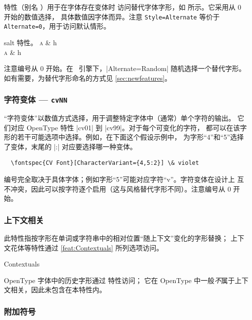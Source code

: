 \documentclass[a4paper]{l3doc}
\begin{document}
 特性（别名 ）用于在字体存在变体时
访问替代字体字形，如  所示。它采用从 0 开始的数值选择，
具体数值因字体而异。注意 \texttt{Style=Alternate} 等价于
\texttt{Alternate=0}，用于访问默认情形。

\begin{Xexample}[firstline=2]{salt}{ 特性。}
  \huge
  \textsc{a} \& h \\
  \textsc{a} \& h
\end{Xexample}

注意编号从 0 开始。在 \LuaTeX\ 引擎下，|Alternate=Random| 随机选择一个替代字形。
如有需要，为替代字形命名的方式见 \vref{sec:newfeatures}。


\subsubsection{字符变体 --- \texttt{cvNN}}

“字符变体”以数值方式选择，用于调整特定字体中（通常）单个字符的输出。
它们对应 OpenType 特性 |cv01| 到 |cv99|。对于每个可变化的字符，
都可以在该字形的若干可能选项中选择。例如，在下面这个假设示例中，
为字形“4”和“5”选择了变体，末尾的 |:| 对应要选择哪一种变体。
\begin{Verbatim}
  \fontspec{CV Font}[CharacterVariant={4,5:2}] \& violet
\end{Verbatim}
编号完全取决于具体字体；例如字形“5”可能对应字符“v”。字符变体在设计上
互不冲突，因此可以按字符逐个启用（这与风格替代字形不同）。注意编号从 0 开始。


\subsubsection{上下文相关}
此特性指按字形在单词或字符串中的相对位置“随上下文”变化的字形替换；
上下文花体等特性通过 \ref{feat:Contextuals} 所列选项访问。

\begin{features}{Contextuals}
\end{features}

OpenType 字体中的历史字形通过  特性访问；
它在 OpenType 中一般\emph{不}属于上下文相关，因此未包含在本特性内。


\subsubsection{附加符号}
\end{document}
